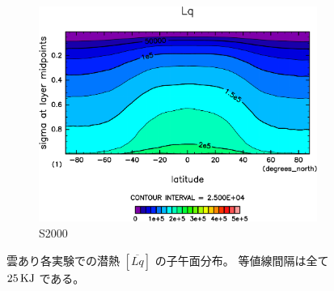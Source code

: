 \documentclass[body]{subfiles}
\begin{document}
\begin{figure}[t]
\begin{subfigure}{.4\textwidth}
		\includegraphics[width=\textwidth]{S2000/Lq,time=7300:7665-crop-rotate.pdf}
		\caption{S2000}\label{LqS2000}
	\end{subfigure}
	\caption[雲あり各実験での潜熱の子午面分布]{
		雲あり各実験での潜熱 \([\overline{Lq}]\) の子午面分布。
		等値線間隔は全て \(25\hmu{KJ}\) である。
	}\label{Lq}
\end{figure}
\end{document}
